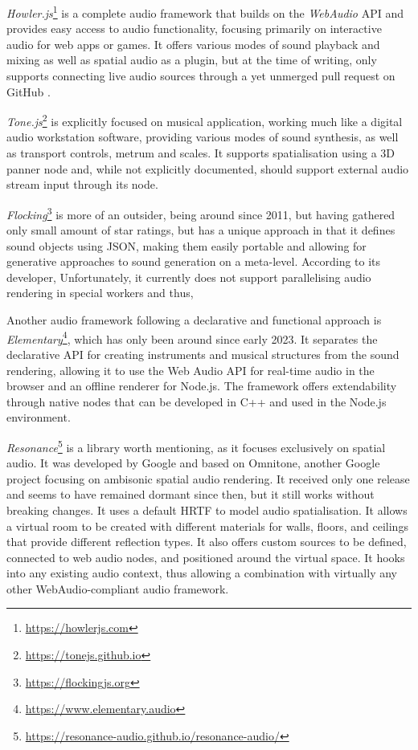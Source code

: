 

\emph{Howler.js}\footnote{\url{https://howlerjs.com}} is a complete audio framework that builds on the \emph{WebAudio} \ac{API} and provides easy access to audio functionality, focusing primarily on interactive audio for web apps or games. It offers various modes of sound playback and mixing as well as spatial audio as a plugin, but at the time of writing, only supports connecting live audio sources through a yet unmerged pull request on GitHub \parencite{githubHowlerPullRequest}.

\emph{Tone.js}\footnote{\url{https://tonejs.github.io}} is explicitly focused on musical application, working much like a digital audio workstation software, providing various modes of sound synthesis, as well as transport controls, metrum and scales. It supports spatialisation using a \ac{3D} panner node and, while not explicitly documented, should support external audio stream input through its  node.

\emph{Flocking}\footnote{\url{https://flockingjs.org}} is more of an outsider, being around since 2011, but having gathered only small amount of star ratings, but has a unique approach in that it defines sound objects using \ac{JSON}, making them easily portable and allowing for generative approaches to sound generation on a meta-level. According to its developer,  Unfortunately, it currently does not support parallelising audio rendering in special workers and thus, 

Another audio framework following a declarative and functional approach is \emph{Elementary}\footnote{\url{https://www.elementary.audio}}, which has only been around since early 2023. It separates the declarative \ac{API} for creating instruments and musical structures from the sound rendering, allowing it to use the Web Audio \ac{API} for real-time audio in the browser and an offline renderer for Node.js. The framework offers extendability through native nodes that can be developed in C++ and used in the Node.js environment.

\emph{Resonance}\footnote{\url{https://resonance-audio.github.io/resonance-audio/}} is a library worth mentioning, as it focuses exclusively on spatial audio. It was developed by Google and based on Omnitone, another Google project focusing on ambisonic spatial audio rendering. It received only one release and seems to have remained dormant since then, but it still works without breaking changes. It uses a default \ac{HRTF} to model audio spatialisation. It allows a virtual room to be created with different materials for walls, floors, and ceilings that provide different reflection types. It also offers custom sources to be defined, connected to web audio nodes, and positioned around the virtual space. It hooks into any existing audio context, thus allowing a combination with virtually any other WebAudio-compliant audio framework.


